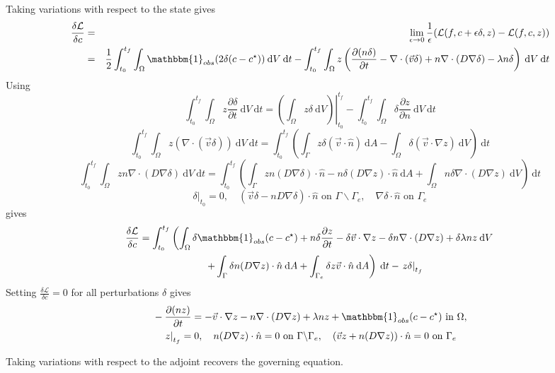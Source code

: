\documentclass[12pt, letterpaper]{article}
\newcommand{\dA}{{\:\textrm{d}A}}
\newcommand{\dV}{{\:\textrm{d}V}}
\newcommand{\dt}{{\:\textrm{d}t}}
\begin{document}
Taking variations with respect to the state gives
\begin{eqnarray*}
\frac{\delta\mathcal{L}}{\delta c} &=& \lim_{\epsilon\to0}\frac{1}{\epsilon}(\mathcal{L}(f,c+\epsilon\delta,z)-\mathcal{L}(f,c,z)) \\
&=& \frac{1}{2}\int_{t_0}^{t_f}\int_\Omega\mathbbm{1}_{obs}(2\delta (c-c^\star)) \dV\dt - \int_{t_0}^{t_f}\int_\Omega z\left(\frac{\partial (n\delta)}{\partial t}-\nabla\cdot(\vec{v}\delta)+n\nabla\cdot (D\nabla \delta)-\lambda n \delta \right)\dV\dt
\end{eqnarray*}
Using
\[
\int_{t_0}^{t_f}\int_\Omega z\frac{\partial\delta}{\partial t} \dV\dt=\left.\left(\int_\Omega z\delta \dV\right)\right\vert^{t_f}_{t_0}-\int_{t_0}^{t_f}\int_\Omega \delta\frac{\partial z}{\partial n}\dV\dt
\]
\[
\int_{t_0}^{t_f}\int_\Omega z(\nabla\cdot(\vec{v}\delta)) \dV\dt = \int_{t_0}^{t_f}\left(\int_\Gamma z\delta(\vec{v}\cdot\hat{n}) \dA -\int_\Omega \delta (\vec{v}\cdot\nabla z) \dV\right)\dt
\]
\[
\int_{t_0}^{t_f}\int_\Omega zn\nabla\cdot(D\nabla\delta) \dV\dt = \int_{t_0}^{t_f}\left(\int_\Gamma zn(D\nabla\delta)\cdot\hat{n}-n\delta(D\nabla z)\cdot\hat{n}\dA + \int_\Omega n\delta\nabla\cdot(D\nabla z) \dV\right)\dt
\]
\[
\left.\delta\right\vert_{t_0}=0,\quad (\vec{v}\delta-nD\nabla\delta)\cdot\hat{n}\textrm{ on }\Gamma\backslash\Gamma_e,\quad\nabla\delta\cdot\hat{n}\textrm{ on }\Gamma_e
\]
gives
\begin{multline*}
\frac{\delta\mathcal{L}}{\delta c} = \int_{t_0}^{t_f}\left(\int_\Omega \delta\mathbbm{1}_{obs}(c-c^\star)+n\delta\frac{\partial z}{\partial t} - \delta\vec{v}\cdot\nabla z - \delta n \nabla\cdot(D\nabla z) + \delta\lambda nz \dV \right. \\
 \quad \left. + \int_\Gamma \delta n(D\nabla z)\cdot\hat{n} \dA + \int_{\Gamma_e} \delta z\vec{v}\cdot\hat{n} \dA\right)\dt -\left.z\delta\right\vert_{t_f}
\end{multline*}
Setting $\frac{\delta\mathcal{L}}{\delta c}=0$ for all perturbations $\delta$ gives
\begin{eqnarray*}
& -\frac{\partial (nz)}{\partial t} = -\vec{v}\cdot\nabla z - n\nabla\cdot(D\nabla z) + \lambda nz + \mathbbm{1}_{obs}(c-c^\star)\textrm{ in }\Omega,\\
& \quad \left.z\right\vert_{t_f}=0,
\quad n(D\nabla z)\cdot\hat{n}=0\textrm{ on }\Gamma\backslash\Gamma_e,
\quad (\vec{v}z+n(D\nabla z))\cdot\hat{n} = 0\textrm{ on }\Gamma_e
\end{eqnarray*}

Taking variations with respect to the adjoint recovers the governing equation.
\end{document}
